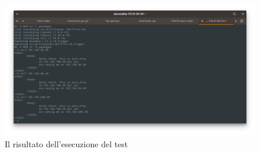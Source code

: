\begin{figure}[h]
  \includegraphics[scale=0.35]{img/test1-result}
  \caption{Il risultato dell'esecuzione del test}
  \label{fig:test1-result}
\end{figure}

